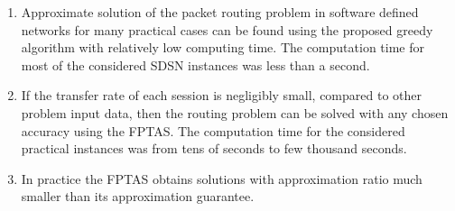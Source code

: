 \documentclass{ifacconf}
\begin{document}
\begin{enumerate}

\item Approximate solution of the packet routing problem in software defined networks for many practical cases can be
found using the proposed greedy algorithm with relatively low computing time.
The computation time for most of the considered SDSN instances was less than a second.

\item If the transfer rate of each session is negligibly small, compared to other problem input data, then the routing problem 
can be solved with any chosen accuracy using the FPTAS. The computation time for the considered practical instances 
was from tens of seconds to few thousand seconds.

\item In practice the FPTAS obtains solutions with approximation ratio much smaller than its approximation guarantee.



\end{enumerate}


   
                                                  
\end{document}
